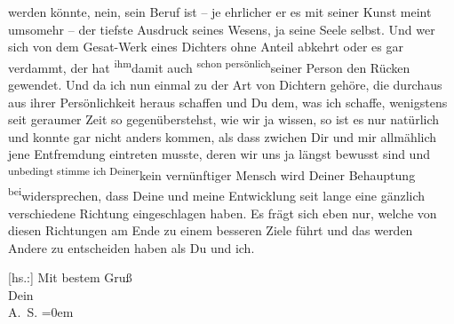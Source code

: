                werden könnte, nein, sein Beruf ist – je ehrlicher er es mit seiner Kunst meint
               umsomehr – der tiefste Ausdruck seines Wesens, ja seine Seele selbst. Und wer sich
               von dem \introOben{}Gesa{\geminationm}t-\introOben{}Werk eines
               Dichters ohne Anteil abkehrt oder es gar verdammt, der hat \substVorne{}\textsuperscript{ihm}\substDazwischen{}damit\substHinten{} auch \substVorne{}\textsuperscript{schon persönlich}{\allowbreak}\substDazwischen{}seiner Person\substHinten{} den Rücken gewendet. Und da ich nun einmal zu der Art von Dichtern gehöre,
               die  durchaus aus ihrer Persönlichkeit heraus schaffen und Du dem, was
               ich schaffe, wenigstens seit geraumer Zeit so gegenüberstehst, wie wir ja wissen, so
               ist es nur natürlich und konnte gar nicht anders kommen, als dass zwichen Dir und mir
               allmählich {\pb}jene Entfremdung eintreten
               musste, deren wir uns ja längst bewusst sind und \substVorne{}\textsuperscript{unbedingt stimme ich Deiner}{\allowbreak}\substDazwischen{}kein vernünftiger Mensch wird Deiner\substHinten{} Behauptung \substVorne{}\textsuperscript{bei}\substDazwischen{}widersprechen\substHinten{}, dass Deine und meine Entwicklung seit lange eine gänzlich verschiedene
               Richtung eingeschlagen haben. Es frägt sich eben nur, welche von diesen Richtungen am
               Ende zu einem besseren Ziele führt und das werden Andere zu entscheiden haben als Du
               und ich.\pend
           
\pstart
           {[}hs.:{]} Mit bestem Gruß {\\[\baselineskip]}Dein {\\[\baselineskip]}\spacefill\mbox{A. S.}\pend
           \leftskip=0em{}\endnumbering{}
\begin{anhang}
\end{anhang}
      